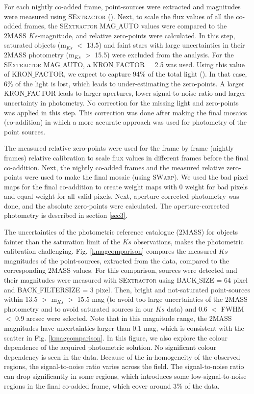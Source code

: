 \documentclass[fleqn,usenatbib]{mnras}
\begin{document}
For each nightly co-added frame, point-sources were extracted and magnitudes were measured using \textsc{SExtractor} (\citealp{sex}). Next, to scale the flux values of all the co-added frames, the \textsc{SExtractor} MAG$\_$AUTO values were compared to the 2MASS $Ks$-magnitude, and relative zero-points were calculated. In this step, saturated objects (m$_{Ks}$ $<$ 13.5) and faint stars with large uncertainties in their 2MASS photometry (m$_{Ks}$ $>$ 15.5) were excluded from the analysis. For the \textsc{SExtractor} MAG$\_$AUTO, a KRON$\_$FACTOR = 2.5 was used. Using this value of KRON$\_$FACTOR, we expect to capture 94\% of the total light (\citealp{kron}). In that case, 6\% of the light is lost, which leads to under-estimating the zero-points. A larger KRON$\_$FACTOR leads to larger apertures, lower signal-to-noise ratio and larger uncertainty in photometry. No correction for the missing light and zero-points was applied in this step. This correction was done after making the final mosaics (co-addition) in which a more accurate approach was used for photometry of the point sources.

The measured relative zero-points were used for the frame by frame (nightly frames) relative calibration to scale flux values in different frames before the final co-addition. Next, the nightly co-added frames and the measured relative zero-points were used to make the final mosaic (using \textsc{SWarp}). We used the bad pixel maps for the final co-addition to create weight maps with 0 weight for bad pixels and equal weight for all valid pixels. Next, aperture-corrected photometry was done, and the absolute zero-points were calculated. The aperture-corrected photometry is described in section \ref{sec3}.

The uncertainties of the photometric reference catalogue (2MASS) for objects fainter than the saturation limit of the $Ks$ observations, makes the photometric calibration challenging. Fig. \ref{kmagcomparison} compares the measured $Ks$ magnitudes of the point-sources, extracted from the data, compared to the corresponding 2MASS values. For this comparison, sources were detected and their magnitudes were measured with \textsc{SExtractor} using BACK$\_$SIZE = 64 pixel and BACK$\_$FILTERSIZE = 3 pixel. Then, bright and not-saturated point-sources within 13.5 $>$ m$_{Ks}$ $>$ 15.5 mag (to avoid too large uncertainties of the 2MASS photometry and to avoid saturated sources in our $Ks$ data) and 0.6 $<$ FWHM $<$ 0.9 arcsec were selected. Note that in this magnitude range, the 2MASS magnitudes have uncertainties larger than 0.1 mag, which is consistent with the scatter in Fig. \ref{kmagcomparison}. In this figure, we also explore the colour dependence of the acquired photometric solution. No significant colour dependency is seen in the data. Because of the in-homogeneity of the observed regions, the signal-to-noise ratio varies across the field. The signal-to-noise ratio can drop significantly in some regions, which introduces some low-signal-to-noise regions in the final co-added frame, which cover around 3\% of the data.
\end{document}

